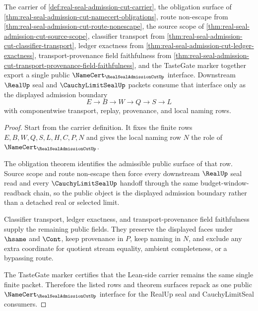 \begin{theorem}
\label{thm:real-seal-admission-cut-public-namecert}
The carrier of \autoref{def:real-seal-admission-cut-carrier}, the obligation surface of \autoref{thm:real-seal-admission-cut-namecert-obligations}, route non-escape from \autoref{thm:real-seal-admission-cut-route-nonescape}, the source scope of \autoref{thm:real-seal-admission-cut-source-scope}, classifier transport from \autoref{thm:real-seal-admission-cut-classifier-transport}, ledger exactness from \autoref{thm:real-seal-admission-cut-ledger-exactness}, transport-provenance field faithfulness from \autoref{thm:real-seal-admission-cut-transport-provenance-field-faithfulness}, and the TasteGate marker together export a single public $\NameCert_{\RealSealAdmissionCutUp}$ interface. Downstream $\RealUp$ seal and $\CauchyLimitSealUp$ packets consume that interface only as the displayed admission boundary
$$
E \to B \to W \to Q \to S \to L
$$
with componentwise transport, replay, provenance, and local naming rows.
\end{theorem}
\begin{proof}
Start from the carrier definition. It fixes the finite rows $E,B,W,Q,S,L,H,C,P,N$ and gives the local naming row $N$ the role of $\NameCert_{\RealSealAdmissionCutUp}$.

The obligation theorem identifies the admissible public surface of that row. Source scope and route non-escape then force every downstream $\RealUp$ seal read and every $\CauchyLimitSealUp$ handoff through the same budget-window-readback chain, so the public object is the displayed admission boundary rather than a detached real or selected limit.

Classifier transport, ledger exactness, and transport-provenance field faithfulness supply the remaining public fields. They preserve the displayed faces under $\hsame$ and $\Cont$, keep provenance in $P$, keep naming in $N$, and exclude any extra coordinate for quotient stream equality, ambient completeness, or a bypassing route.

The TasteGate marker certifies that the Lean-side carrier remains the same single finite packet. Therefore the listed rows and theorem surfaces repack as one public $\NameCert_{\RealSealAdmissionCutUp}$ interface for the RealUp seal and CauchyLimitSeal consumers.
\end{proof}


